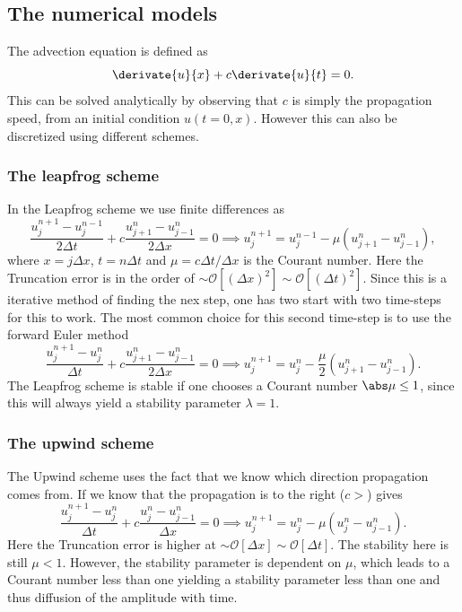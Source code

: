 \subsection{The numerical models}
The advection equation is defined as 
\begin{equation}
    \derivate{u}{x}+c\derivate{u}{t}=0.
    \label{eq:advection}
\end{equation}
This can be solved analytically by observing that $c$ is simply the propagation speed, from an initial condition $u(t=0,x)$. However this can also be discretized using different schemes. 

\subsubsection{The leapfrog scheme}
In the Leapfrog scheme we use finite differences as 
\begin{equation}
    \frac{u_j^{n+1}-u_j^{n-1}}{2\Delta t} + c \frac{u_{j+1}^n-u_{j-1}^n}{2\Delta x}=0 \implies u_j^{n+1}=u_j^{n-1}-\mu \left(u_{j+1}^n-u_{j-1}^n\right),
    \label{eq:leapfrog} 
\end{equation}
where $x=j\Delta x$, $t=n\Delta t$ and $\mu=c\Delta t/ \Delta x$ is the Courant number. Here the Truncation error is in the order of $\sim \mathcal{O}\left[ (\Delta x)^2\right]\sim \mathcal{O}\left[ (\Delta t)^2\right]$. Since this is a iterative method of finding the nex step, one has two start with two time-steps for this to work. The most common choice for this second time-step is to use the forward Euler method
\begin{equation}
    \frac{u_j^{n+1}-u_j^{n}}{\Delta t} + c \frac{u_{j+1}^n-u_{j-1}^n}{2\Delta x}=0 \implies
u_j^{n+1} = u_j^n - \frac{\mu}{2} \left(u_{j+1}^n - u_{j-1}^n \right).
    \label{eq:forwardEuler}
\end{equation}
The Leapfrog scheme is stable if one chooses a Courant number $\abs\mu\leq1$, since this will always yield a stability parameter $\lambda=1$.  

\subsubsection{The upwind scheme}
The Upwind scheme uses the fact that we know which direction propagation comes from. If we know that the propagation is to the right ($c>$) gives 
\begin{equation}
    \frac{u_j^{n+1}-u_j^{n}}{\Delta t} + c \frac{u_j^n-u_{j-1}^n}{\Delta x}=0 \implies
u_j^{n+1} = u_j^n - \mu \left(u_j^n - u_{j-1}^n \right).
    \label{eq:upwind}
\end{equation}
Here the Truncation error is higher at $\sim \mathcal{O}\left[ \Delta x\right]\sim \mathcal{O}\left[ \Delta t\right]$. The stability here is still $\mu<1$. However, the stability parameter is dependent on $\mu$, which leads to a Courant number less than one yielding a stability parameter less than one and thus diffusion of the amplitude with time.

